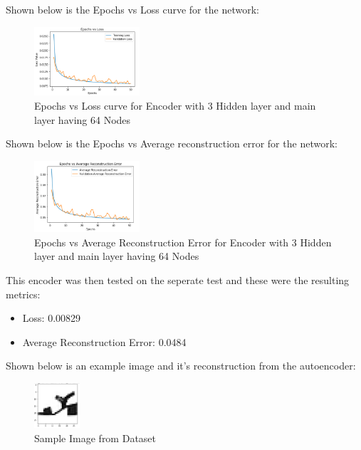 \documentclass[conference]{IEEEtran}
\begin{document}
    Shown below is the Epochs vs Loss curve for the network:

    \begin{figure}[H]
        \centering
        \captionsetup{justification=centering}
        \centering
            \includegraphics[width=0.35\textwidth]{18.png}
            \caption{Epochs vs Loss curve for Encoder with 3 Hidden layer and main layer having 64 Nodes}
    \end{figure}

    Shown below is the Epochs vs Average reconstruction error for the network:

    \begin{figure}[H]
        \centering
        \captionsetup{justification=centering}
        \centering
            \includegraphics[width=0.35\textwidth]{19.png}
            \caption{Epochs vs Average Reconstruction Error for Encoder with 3 Hidden layer and main layer having 64 Nodes}
    \end{figure}

    This encoder was then tested on the seperate test and these were the resulting metrics:

    \begin{itemize}
        \item Loss: 0.00829
        \item Average Reconstruction Error: 0.0484\\
    \end{itemize}

    Shown below is an example image and it's reconstruction from the autoencoder:

    \begin{figure}[H]
        \centering
        \captionsetup{justification=centering}
        \centering
            \includegraphics[width=0.15\textwidth]{20.png}
            \caption{Sample Image from Dataset}
    \end{figure}
\end{document}

